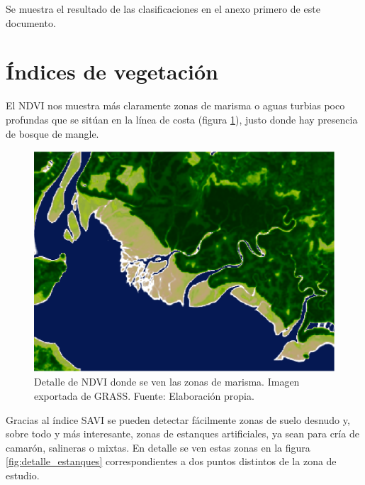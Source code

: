 Se muestra el resultado de las clasificaciones en el anexo primero de este documento.

\section{Índices de vegetación}
El \ac{NDVI} nos muestra más claramente zonas de marisma o aguas turbias poco profundas que se sitúan en la línea de costa (figura \ref{fig:detalle_aguas}), justo donde hay presencia de bosque de mangle.\Sep

\begin{figure}
	\centering
	\includegraphics[width=0.8\linewidth]{./Imagenes/Detalle_aguas.eps}
	\caption[Detalle marismas en NDVI]{Detalle de NDVI donde se ven las zonas de marisma. Imagen exportada de GRASS. Fuente: Elaboración propia.}
	\label{fig:detalle_aguas}
\end{figure}

Gracias al índice \ac{SAVI} se pueden detectar fácilmente zonas de suelo desnudo y, sobre todo y más interesante, zonas de estanques artificiales, ya sean para cría de camarón, salineras o mixtas. En detalle se ven estas zonas en la figura \ref{fig:detalle_estanques} correspondientes a dos puntos distintos de la zona de estudio.\Sep

